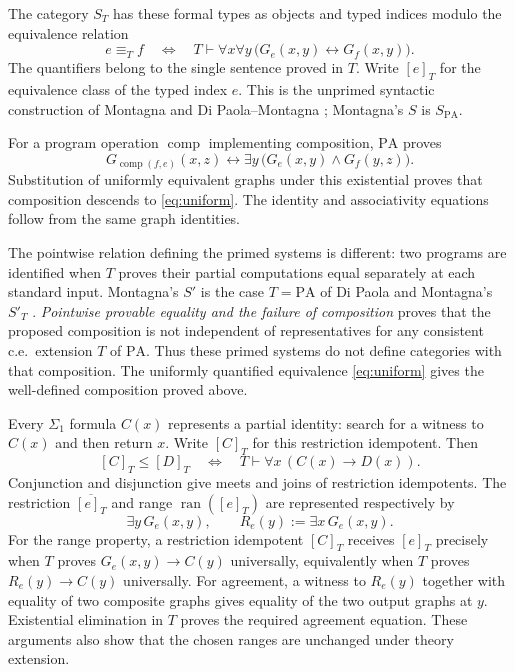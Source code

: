\documentclass[11pt]{article}
\newcommand{\PA}{\mathrm{PA}}
\newcommand{\ran}{\operatorname{ran}}
\begin{document}
The category $S_T$ has these formal types as objects and typed indices
modulo the equivalence relation
\begin{equation}\label{eq:uniform}
 e\equiv_T f
 \quad\Longleftrightarrow\quad
 T\vdash \forall x\forall y\,
       \bigl(G_e(x,y)\leftrightarrow G_f(x,y)\bigr).
\end{equation}
The quantifiers belong to the single sentence proved in $T$.
Write $[e]_T$ for the equivalence class of the typed index $e$.
This is the unprimed syntactic construction of Montagna and
Di Paola--Montagna \cite{Montagna,DPM}; Montagna's $S$ is $S_{\PA}$.

For a program operation $\operatorname{comp}$ implementing composition,
$\PA$ proves
\begin{equation}\label{eq:composition}
 G_{\operatorname{comp}(f,e)}(x,z)
 \leftrightarrow
 \exists y\,\bigl(G_e(x,y)\land G_f(y,z)\bigr).
\end{equation}
Substitution of uniformly equivalent graphs under this existential proves
that composition descends to \eqref{eq:uniform}. The identity and
associativity equations follow from the same graph identities.

The pointwise relation defining the primed systems is different:
two programs are identified when $T$ proves their partial computations
equal separately at each standard input. Montagna's $S'$ is the case
$T=\PA$ of Di Paola and Montagna's $S'_T$ \cite{Montagna,DPM}.
\emph{Pointwise provable equality and the failure of composition}
\cite[Corollary 2]{Composition} proves that the proposed composition
is not independent of representatives for any consistent c.e.\
extension $T$ of $\PA$. Thus these primed systems do not define
categories with that composition. The uniformly quantified equivalence
\eqref{eq:uniform} gives the well-defined composition proved above.

Every $\Sigma_1$ formula $C(x)$ represents a partial identity: search for
a witness to $C(x)$ and then return $x$. Write $[C]_T$ for this
restriction idempotent.
Then
\begin{equation}\label{eq:domain-order}
 [C]_T\le[D]_T
 \quad\Longleftrightarrow\quad
 T\vdash\forall x\,(C(x)\longrightarrow D(x)).
\end{equation}
Conjunction and disjunction give meets and joins of restriction
idempotents. The restriction $\overline{[e]_T}$ and range $\ran([e]_T)$
are represented respectively by
\[
 \exists y\,G_e(x,y),\qquad
 R_e(y):=\exists x\,G_e(x,y).
\]
For the range property, a restriction idempotent $[C]_T$ receives
$[e]_T$ precisely when
$T$ proves $G_e(x,y)\to C(y)$ universally, equivalently when
$T$ proves $R_e(y)\to C(y)$ universally. For agreement, a witness to
$R_e(y)$ together with equality of two composite graphs gives equality
of the two output graphs at $y$. Existential elimination in $T$ proves
the required agreement equation. These arguments also show that the
chosen ranges are unchanged under theory extension.
\end{document}
